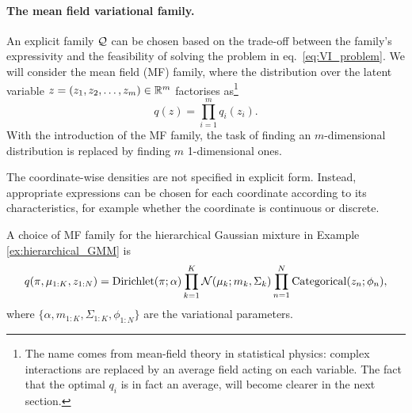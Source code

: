 \paragraph{The mean field variational family.} An explicit family ${\mathcal Q}$ can be chosen based on the trade-off between the family's expressivity and the feasibility of solving the problem in eq.~\eqref{eq:VI_problem}. We will consider the mean field (MF) family, where the distribution over the latent variable $z = (z_1,z_2,\ldots,z_m)\in{\mathbb R}^m$ factorises as\footnote{The name comes from mean-field theory in statistical physics: complex interactions are replaced by an average field acting on each variable. The fact that the optimal $q_i$ is in fact an average, will become clearer in the next section.}
\begin{equation}
    q(z) = \prod_{i=1}^mq_i(z_i).
\end{equation}
With the introduction of the MF family, the task of finding an $m$-dimensional distribution is replaced by finding $m$ 1-dimensional ones. 

\begin{remark}
The coordinate-wise densities are not specified in explicit form. Instead, appropriate expressions can be chosen for each coordinate according to its characteristics, for example whether the coordinate is continuous or discrete.
\end{remark}

\begin{example}
    A choice of MF family for the hierarchical Gaussian mixture in Example \ref{ex:hierarchical_GMM} is
    \[
    q(\pi,\mu_{1:K}, z_{1:N}) = \mathrm{Dirichlet}(\pi; \alpha) \prod_{k=1}^{K} {\mathcal N}(\mu_k; m_k, \Sigma_k) \prod_{n=1}^{N} \mathrm{Categorical}(z_n; \phi_n),
    \]
    where $\{\alpha, m_{1:K}, \Sigma_{1:K}, \phi_{1:N}\}$ are the variational parameters.
\end{example}

